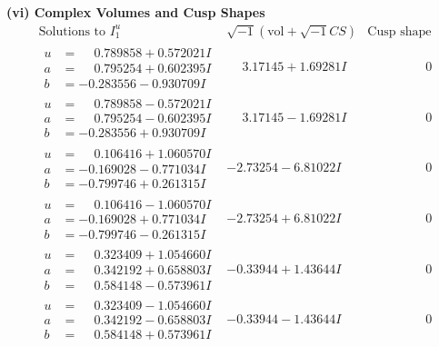 \documentclass[1p]{elsarticle_modified}
\theoremstyle{definition}
\newcommand{\I}{\sqrt{-1}}
\begin{document}
\newpage\flushleft \textbf{(vi) Complex Volumes and Cusp Shapes}
$$\begin{array}{c|c|c}  
\text{Solutions to }I^u_{1}& \I (\text{vol} + \sqrt{-1}CS) & \text{Cusp shape}\\
 \hline 
\begin{aligned}
u &= \phantom{-}0.789858 + 0.572021 I \\
a &= \phantom{-}0.795254 + 0.602395 I \\
b &= -0.283556 - 0.930709 I\end{aligned}
 & \phantom{-}3.17145 + 1.69281 I & \phantom{-0.000000 } 0 \\ \hline\begin{aligned}
u &= \phantom{-}0.789858 - 0.572021 I \\
a &= \phantom{-}0.795254 - 0.602395 I \\
b &= -0.283556 + 0.930709 I\end{aligned}
 & \phantom{-}3.17145 - 1.69281 I & \phantom{-0.000000 } 0 \\ \hline\begin{aligned}
u &= \phantom{-}0.106416 + 1.060570 I \\
a &= -0.169028 - 0.771034 I \\
b &= -0.799746 + 0.261315 I\end{aligned}
 & -2.73254 - 6.81022 I & \phantom{-0.000000 } 0 \\ \hline\begin{aligned}
u &= \phantom{-}0.106416 - 1.060570 I \\
a &= -0.169028 + 0.771034 I \\
b &= -0.799746 - 0.261315 I\end{aligned}
 & -2.73254 + 6.81022 I & \phantom{-0.000000 } 0 \\ \hline\begin{aligned}
u &= \phantom{-}0.323409 + 1.054660 I \\
a &= \phantom{-}0.342192 + 0.658803 I \\
b &= \phantom{-}0.584148 - 0.573961 I\end{aligned}
 & -0.33944 + 1.43644 I & \phantom{-0.000000 } 0 \\ \hline\begin{aligned}
u &= \phantom{-}0.323409 - 1.054660 I \\
a &= \phantom{-}0.342192 - 0.658803 I \\
b &= \phantom{-}0.584148 + 0.573961 I\end{aligned}
 & -0.33944 - 1.43644 I & \phantom{-0.000000 } 0 \\ \hline\begin{aligned}

\end{aligned}
\end{array}$$
\end{document}
